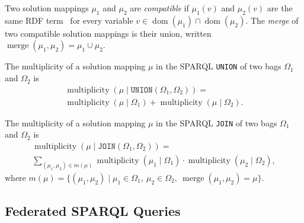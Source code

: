 \begin{definition}\label{def_merge}
  Two solution mappings $\mu_1$ and $\mu_2$ are \emph{compatible} if $\mu_1(v)$ and $\mu_2(v)$ are the same \ac{RDF} term~\cite{w3ConceptsAbstract} for every variable $v \in \operatorname{dom}(\mu_1) \cap \operatorname{dom}(\mu_2)$.
  The \emph{merge} of two compatible solution mappings is their union, written $\operatorname{merge}(\mu_1, \mu_2) = \mu_1 \cup \mu_2$.
\end{definition}

\begin{definition}\label{def_union_multiplicity}
  The multiplicity of a solution mapping $\mu$ in the SPARQL \texttt{UNION} of two bags $\Omega_1$ and $\Omega_2$ is
  \begin{multline*}
  \operatorname{multiplicity}(\mu \mid \texttt{UNION}(\Omega_1, \Omega_2)) = \\
  \operatorname{multiplicity}(\mu \mid \Omega_1) + \operatorname{multiplicity}(\mu \mid \Omega_2).
  \end{multline*}
\end{definition}

\begin{definition}\label{def_join_multiplicity}
  The multiplicity of a solution mapping $\mu$ in the SPARQL \texttt{JOIN} of two bags $\Omega_1$ and $\Omega_2$ is
  \begin{multline*}
  \operatorname{multiplicity}(\mu \mid \texttt{JOIN}(\Omega_1, \Omega_2)) = \\
  \sum_{(\mu_1, \mu_2) \in m(\mu)} \operatorname{multiplicity}(\mu_1 \mid \Omega_1) \cdot \operatorname{multiplicity}(\mu_2 \mid \Omega_2),
  \end{multline*}
  where $m(\mu) = \{(\mu_1, \mu_2) \mid \mu_1 \in \Omega_1,\ \mu_2 \in \Omega_2,\ \operatorname{merge}(\mu_1, \mu_2) = \mu\}$.
\end{definition}

\subsection{Federated SPARQL Queries}

